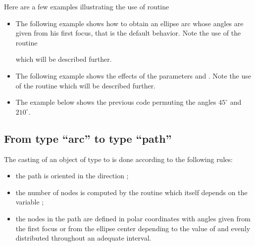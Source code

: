 \documentclass[pdftex]{article}
\begin{document}
Here are a few examples illustrating the use of routine\linebreak
{}
\begin{itemize}
\item The following example shows how to obtain an ellipse arc whose
  angles are given from his first focus, that is the default behavior.
  Note the use of the routine
   which will be
  described further.
\item The following example shows the effects of the parameters
   and . Note the use of the
  routine  which will be described further.
\item The example below shows the previous code permuting the angles
  $45^{\circ}$ and $210^{\circ}$.
\end{itemize}

\subsection{From type ``arc'' to type ``path''}
The casting of an object  of type  to 
is done according to the following rules:
\begin{itemize}
\item the path is oriented in the direction ;
\item the number of nodes is computed by the routine\linebreak{}%
   which itself depends on the variable
  ;
\item the nodes in the path are defined in polar coordinates with
  angles given from the first focus or from the ellipse center
  depending to the value of  and evenly distributed throughout
  an adequate interval.
\end{itemize}
{}
\end{document}
